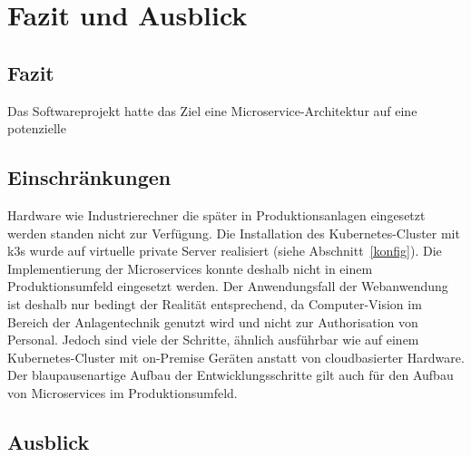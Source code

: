\chapter{Fazit und Ausblick}
\section{Fazit}
Das Softwareprojekt hatte das Ziel eine Microservice-Architektur auf eine potenzielle 


\section{Einschränkungen}\label{Einschraenkungen}
Hardware wie Industrierechner die später in Produktionsanlagen eingesetzt werden standen nicht zur Verfügung.
Die Installation des Kubernetes-Cluster mit k3s wurde auf virtuelle private Server realisiert (siehe Abschnitt~\ref{konfig}).
Die Implementierung der Microservices konnte deshalb nicht in einem Produktionsumfeld eingesetzt werden.
Der Anwendungsfall der Webanwendung ist deshalb nur bedingt der Realität entsprechend, da Computer-Vision im Bereich der Anlagentechnik genutzt wird und nicht zur Authorisation von Personal.
Jedoch sind viele der Schritte, ähnlich ausführbar wie auf einem Kubernetes-Cluster mit on-Premise Geräten anstatt von cloudbasierter Hardware.
Der blaupausenartige Aufbau der Entwicklungsschritte gilt auch für den Aufbau von Microservices im Produktionsumfeld.

\section{Ausblick}
